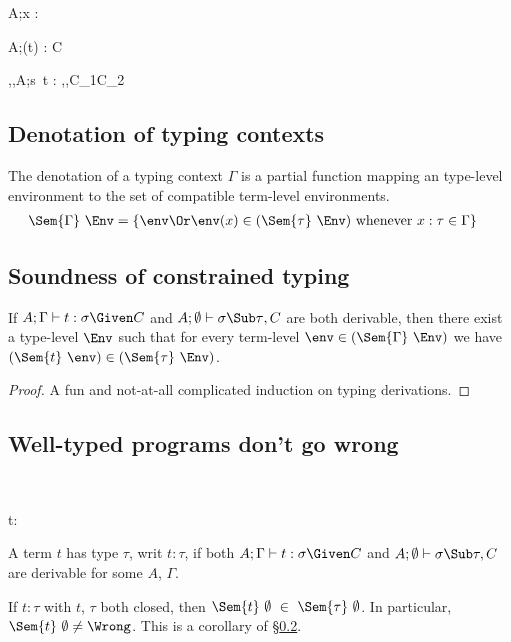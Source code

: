 \documentclass{amsart}
\theoremstyle{definition}
\begin{document}
{A;\Gamma\vdash x : \tau \Given \emptyset}

{A;\Gamma\vdash (t) : \sigma\R\tau \Given C}

{\alpha,\beta,A;\Gamma\vdash s~t : \beta \Given
\sigma\Sub\alpha\R\beta,\tau\Sub\alpha,C_1\cup C_2}

\subsection{Denotation of typing contexts}
The denotation of a typing context $\Gamma$ is a partial function
mapping an type-level environment to the set of compatible
term-level environments.
\begin{align*}
\Sem{\Gamma}~\Env&=
\left\{\env \Or
\env(x)\in(\Sem{\tau}~\Env)\text{ whenever }x:\tau\in\Gamma
\right\}
\end{align*}

\subsection{Soundness of constrained typing}
\label{consound}
If
$A;\Gamma\vdash t : \sigma\Given C$ and
$A;\emptyset\vdash{\sigma\Sub\tau},C$
are both derivable, then there exist a type-level $\Env$ such
that for every term-level $\env\in(\Sem{\Gamma}~\Env)$ we have
$(\Sem{t}~\env)\in(\Sem{\tau}~\Env)$.

\begin{proof}
A fun and not-at-all complicated induction on typing derivations.
\end{proof}

\subsection{Well-typed programs don't go wrong}~

{t:\tau}

A term $t$ has type $\tau$, writ $t:\tau$, if both
$A;\Gamma\vdash t : \sigma\Given C$ and
$A;\emptyset\vdash\sigma\Sub\tau,C$ are derivable for some $A$,
$\Gamma$.

If $t:\tau$ with $t$, $\tau$ both closed, then
$\Sem{t}~\emptyset~\in~\Sem{\tau}~\emptyset$. In particular,
$\Sem{t}~\emptyset\neq\Wrong$. This is a corollary of
\S\ref{consound}.




\end{document}
